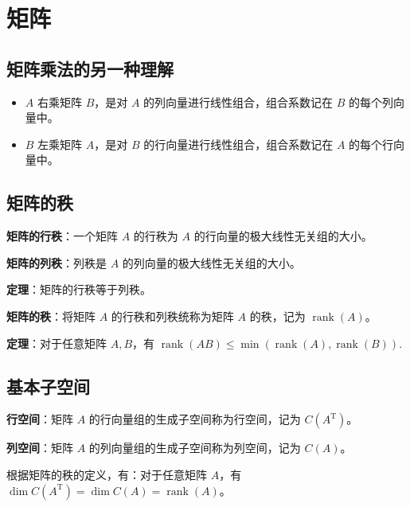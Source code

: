 \section{矩阵}

\subsection{矩阵乘法的另一种理解}

\begin{itemize}
    \item $A$ 右乘矩阵 $B$，是对 $A$ 的列向量进行线性组合，组合系数记在 $B$ 的每个列向量中。
    \item $B$ 左乘矩阵 $A$，是对 $B$ 的行向量进行线性组合，组合系数记在 $A$ 的每个行向量中。
\end{itemize}

\subsection{矩阵的秩}

\begin{tcolorbox}
    \textbf{矩阵的行秩}：一个矩阵 $A$ 的行秩为 $A$ 的行向量的极大线性无关组的大小。

    \textbf{矩阵的列秩}：列秩是 $A$ 的列向量的极大线性无关组的大小。
\end{tcolorbox}

\begin{tcolorbox}
    \textbf{定理}：矩阵的行秩等于列秩。
\end{tcolorbox}

\begin{tcolorbox}
    \textbf{矩阵的秩}：将矩阵 $A$ 的行秩和列秩统称为矩阵 $A$ 的秩，记为 $\operatorname{rank}(A)$。
\end{tcolorbox}

\begin{tcolorbox}
    \textbf{定理}：对于任意矩阵 $A,B$，有 $\operatorname{rank}(AB)\le \min(\operatorname{rank}(A),\operatorname{rank}(B))$.
\end{tcolorbox}


\subsection{基本子空间}

\begin{tcolorbox}
    \textbf{行空间}：矩阵 $A$ 的行向量组的生成子空间称为行空间，记为 $C(A^{\mathrm{T}})$。

    \textbf{列空间}：矩阵 $A$ 的列向量组的生成子空间称为列空间，记为 $C(A)$。
\end{tcolorbox}
\begin{tcolorbox}
    根据矩阵的秩的定义，有：对于任意矩阵 $A$，有 $\dim C(A^{\mathrm{T}})=\dim C(A)=\operatorname{rank}(A)$。
\end{tcolorbox}

